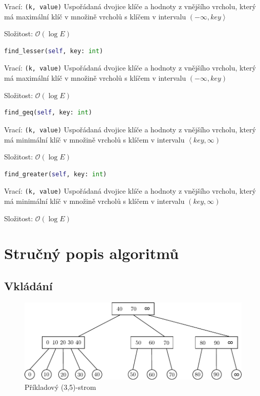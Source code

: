 \documentclass[a4paper,11pt,openany]{article}
\begin{document}
Vrací: \texttt{(k, value)} Uspořádaná dvojice klíče a hodnoty z vnějšího vrcholu, který má maximální klíč v množině vrcholů s klíčem v intervalu $\left( -\infty, key\right\rangle $
	
Složitost: $\mathcal{O}(\log E)$
	
\begin{lstlisting}[language=python,frame=none]
find_lesser(self, key: int)
\end{lstlisting}
	
Vrací: \texttt{(k, value)} Uspořádaná dvojice klíče a hodnoty z vnějšího vrcholu, který má maximální klíč v množině vrcholů s klíčem v intervalu $\left( -\infty, key\right) $
	
Složitost: $\mathcal{O}(\log E)$
	
\begin{lstlisting}[language=python,frame=none]
find_geq(self, key: int)
\end{lstlisting}
	
Vrací: \texttt{(k, value)} Uspořádaná dvojice klíče a hodnoty z vnějšího vrcholu, který má minimální klíč v množině vrcholů s klíčem v intervalu $\left\langle key, \infty \right) $
	
Složitost: $\mathcal{O}(\log E)$
	
\begin{lstlisting}[language=python,frame=none]
find_greater(self, key: int)
\end{lstlisting}
	
Vrací: \texttt{(k, value)} Uspořádaná dvojice klíče a hodnoty z vnějšího vrcholu, který má minimální klíč v množině vrcholů s klíčem v intervalu $\left( key, \infty \right) $
	
Složitost: $\mathcal{O}(\log E)$
	
\section{Stručný popis algoritmů}
	
\subsection{Vkládání}
\begin{figure}
\centering
\includegraphics{pics/drawing.pdf}
\caption{Příkladový (3,5)-strom}
\end{figure}
	
\end{document}
